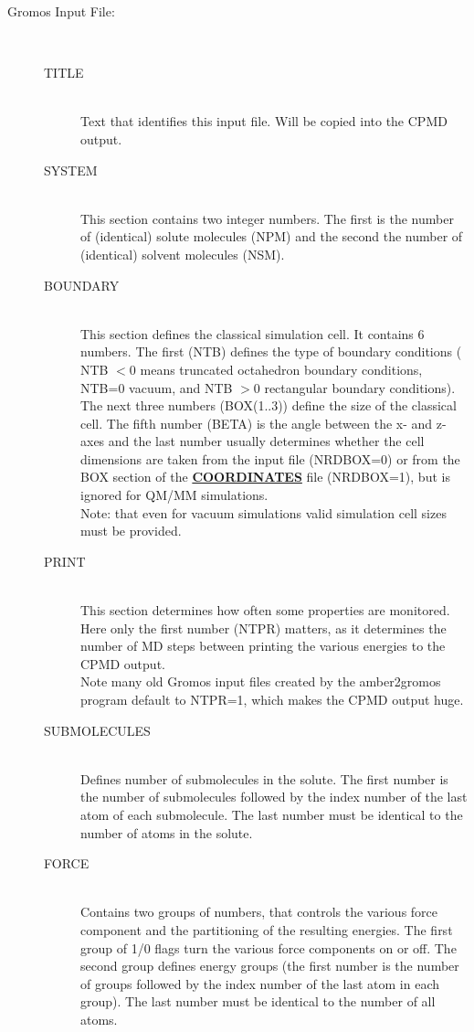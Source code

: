 \documentclass[twoside,10pt,titlepage,a4paper]{article}
\newcommand{\referto}[2]{\hyperlink{#1}{#2}}
\newcommand{\referto}[2]{\htmlref{#2}{#1}}
\newcommand{\refkeyword}[1]{%
\referto{#1}{\textbf{#1}}%
\index{#1}%
}%
\begin{document}
\begin{description}
\item[Gromos Input File:]~\\
  \begin{description}
  \item[TITLE]~\\
    Text that identifies this input file.
    Will be copied into the CPMD output.
  \item[SYSTEM]~\\
    This section contains two integer numbers. The first
    is the number of (identical) solute molecules (NPM) and the
    second the number of (identical) solvent molecules (NSM).
  \item[BOUNDARY]~\\
    This section defines the classical simulation cell.
    It contains 6 numbers. The first (NTB) defines the type
    of boundary conditions ( NTB $<0$ means truncated octahedron boundary
    conditions, NTB=0 vacuum, and NTB $>0$ rectangular boundary
    conditions).\\
    The next three numbers (BOX(1..3)) define the size of the classical
    cell. The fifth number (BETA) is the angle between the x- and z-axes
    and the last number usually determines whether the cell dimensions
    are taken from the input file (NRDBOX=0) or from the BOX section
    of the \refkeyword{COORDINATES} file (NRDBOX=1), but is ignored
    for QM/MM simulations.\\
    Note: that even for vacuum simulations valid simulation cell
    sizes must be provided.
  \item[PRINT]~\\
    This section determines how often some properties are monitored.
    Here only the first number (NTPR) matters, as it determines the
    number of MD steps between printing the various energies to the
    CPMD output.\\
    Note many old Gromos input files created by the amber2gromos program
    default to NTPR=1, which makes the CPMD output huge.
  \item[SUBMOLECULES]~\\
    Defines number of submolecules in the solute. The first number
    is the number of submolecules followed by the index number of
    the last atom of each submolecule. The last number must be identical
    to the number of atoms in the solute.
  \item[FORCE]~\\
    Contains two groups of numbers, that controls the various force
    component and the partitioning of the resulting energies. The first
    group of 1/0 flags turn the various force components on or off.
    The second group defines energy groups (the first number is the
    number of groups followed by the index number of the last atom
    in each group). The last number must be identical
    to the number of all atoms.
  \end{description}


\end{description}
\end{document}
